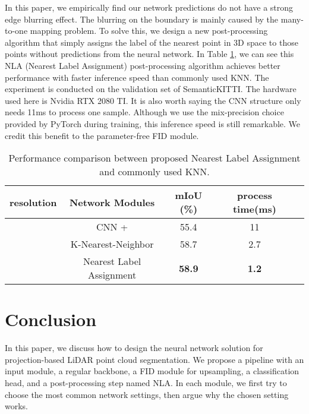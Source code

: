 \documentclass[letterpaper, 10 pt, conference]{ieeeconf}
\begin{document}
In this paper, we empirically find our network predictions do not have a strong edge blurring effect. The blurring on the boundary is mainly caused by the many-to-one mapping problem. To solve this, we design a new post-processing algorithm that simply assigns the label of the nearest point in 3D space to those points without predictions from the neural network. In Table \ref{tab:table2}, we can see this NLA (Nearest Label Assignment) post-processing algorithm achieves better performance with faster inference speed than commonly used KNN. The experiment is conducted on the validation set of SemanticKITTI. The hardware used here is Nvidia RTX 2080 TI. It is also worth saying the CNN structure only needs 11ms to process one sample. Although we use the mix-precision choice provided by PyTorch during training, this inference speed is still remarkable. We credit this benefit to the parameter-free FID module.

\begin{table}
\begin{center}
\caption{Performance comparison between proposed Nearest Label Assignment and commonly used KNN.}
\label{tab:table2}
    \setlength{\tabcolsep}{2.pt}
      \renewcommand{\arraystretch}{1.3} 
\begin{tabular}{ |c|c|c|c|c| } 
\hline
resolution & Network Modules & mIoU (\%) & process time(ms)\\
\hline
\multirow{3}{5em}{} & CNN + & 55.4 & 11  \\ 
\cline{2-4}
&  K-Nearest-Neighbor & 58.7 & 2.7\\
&  Nearest Label Assignment & \textbf{58.9} & \textbf{1.2}\\
\hline
\end{tabular}
\end{center}
    \vspace{-7mm}
\end{table}

\section{Conclusion}
In this paper, we discuss how to design the neural network solution for projection-based LiDAR point cloud segmentation. We propose a pipeline with an input module, a regular backbone, a FID module for upsampling, a classification head, and a post-processing step named NLA. In each module, we first try to choose the most common network settings, then argue why the chosen setting works.
\end{document}
